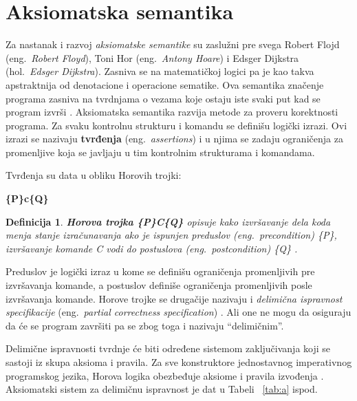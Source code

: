 \documentclass[a4paper]{article}
\newtheorem{definicija}{Definicija}[section]
\begin{document}
\section{Aksiomatska semantika}
\label{sec:akssem}
\qquad Za nastanak i razvoj \textit{aksiomatske semantike}  su zaslužni pre svega Robert Flojd (eng.~{\em  Robert Floyd}), Toni Hor (eng.~{\em  Antony Hoare}) i Edsger Dijkstra (hol.~{\em Edsger Dijkstra}).
 Zasniva se na matematičkoj logici pa je kao takva apstraktnija od denotacione i operacione sematike. Ova semantika
 značenje programa zasniva na tvrdnjama o vezama koje ostaju iste svaki put kad se program izvrši \cite{slonneger1995book}.
 Aksiomatska semantika razvija metode za proveru korektnosti programa. Za svaku kontrolnu strukturu i komandu se definišu logički izrazi. Ovi izrazi se nazivaju \textbf{tvrđenja} (eng.~{\em  assertions}) i u njima se zadaju ograničenja za promenljive koja se javljaju u tim kontrolnim strukturama i komandama.

\begin{tcolorbox}
Tvrđenja su data u obliku Horovih trojki:

  \center \textbf{\{P\}c\{Q\}}

\end{tcolorbox}




\begin{definicija}
\textbf{Horova trojka \{P\}C\{Q\}} opisuje kako izvršavanje dela koda menja stanje izračunavanja ako je ispunjen preduslov (eng.~{\em  precondition}) \{P\}, izvršavanje komande C vodi do postuslova (eng.~{\em  postcondition}) \{Q\} \cite{milena} .

\end{definicija}

Preduslov je logički izraz u kome se definišu ograničenja promenljivih pre izvršavanja komande, a postuslov definiše ograničenja promenljivih posle izvršavanja komande.
Horove trojke se drugačije nazivaju i \textit{delimična ispravnost specifikacije } (eng.~{\em  partial correctness specification}) .
Ali one ne mogu da osiguraju da će se program završiti pa se zbog toga i nazivaju “delimičnim”.

Delimične ispravnosti tvrdnje će biti određene sistemom zaključivanja koji se sastoji iz skupa aksioma i pravila. Za sve konstruktore jednostavnog imperativnog programskog jezika, Horova logika obezbeđuje aksiome i pravila izvođenja \cite{milena}. Aksiomatski sistem za delimičnu ispravnost je dat u Tabeli ~\ref{tab:a} ispod.
\end{document}

